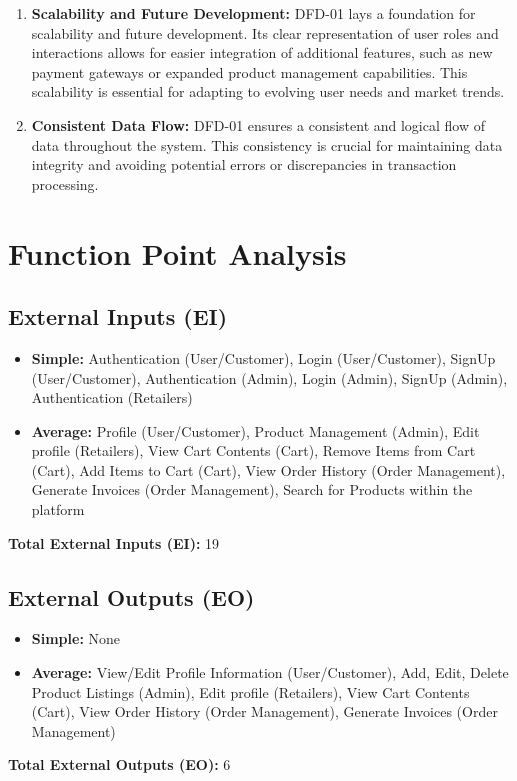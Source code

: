 \documentclass[a4paper,12pt]{article}
\begin{document}
\begin{enumerate}
  \item \textbf{Scalability and Future Development:} DFD-01 lays a foundation for scalability and future development. Its clear representation of user roles and interactions allows for easier integration of additional features, such as new payment gateways or expanded product management capabilities. This scalability is essential for adapting to evolving user needs and market trends.

  \item \textbf{Consistent Data Flow:} DFD-01 ensures a consistent and logical flow of data throughout the system. This consistency is crucial for maintaining data integrity and avoiding potential errors or discrepancies in transaction processing.

\end{enumerate}

\section{Function Point Analysis}

\subsection{External Inputs (EI)}
\begin{itemize}
    \item \textbf{Simple:} Authentication (User/Customer), Login (User/Customer), SignUp (User/Customer), Authentication (Admin), Login (Admin), SignUp (Admin), Authentication (Retailers)
    \item \textbf{Average:} Profile (User/Customer), Product Management (Admin), Edit profile (Retailers), View Cart Contents (Cart), Remove Items from Cart (Cart), Add Items to Cart (Cart), View Order History (Order Management), Generate Invoices (Order Management), Search for Products within the platform
\end{itemize}
\textbf{Total External Inputs (EI):} 19

\subsection{External Outputs (EO)}
\begin{itemize}
    \item \textbf{Simple:} None
    \item \textbf{Average:} View/Edit Profile Information (User/Customer), Add, Edit, Delete Product Listings (Admin), Edit profile (Retailers), View Cart Contents (Cart), View Order History (Order Management), Generate Invoices (Order Management)
\end{itemize}
\textbf{Total External Outputs (EO):} 6
\end{document}
